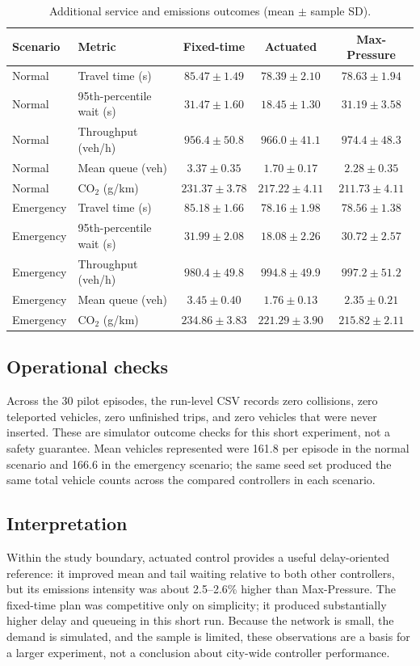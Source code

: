 \documentclass[11pt,a4paper]{article}
\begin{document}
\begin{table}[htbp]
\centering\small
\caption{Additional service and emissions outcomes (mean $\pm$ sample SD).}
\begin{tabular}{llccc}
\toprule
\textbf{Scenario} & \textbf{Metric} & \textbf{Fixed-time} & \textbf{Actuated} & \textbf{Max-Pressure} \\
\midrule
Normal & Travel time (s) & $85.47\pm1.49$ & $78.39\pm2.10$ & $78.63\pm1.94$ \\
Normal & 95th-percentile wait (s) & $31.47\pm1.60$ & $18.45\pm1.30$ & $31.19\pm3.58$ \\
Normal & Throughput (veh/h) & $956.4\pm50.8$ & $966.0\pm41.1$ & $974.4\pm48.3$ \\
Normal & Mean queue (veh) & $3.37\pm0.35$ & $1.70\pm0.17$ & $2.28\pm0.35$ \\
Normal & CO$_2$ (g/km) & $231.37\pm3.78$ & $217.22\pm4.11$ & $\mathbf{211.73\pm4.11}$ \\
\midrule
Emergency & Travel time (s) & $85.18\pm1.66$ & $78.16\pm1.98$ & $78.56\pm1.38$ \\
Emergency & 95th-percentile wait (s) & $31.99\pm2.08$ & $18.08\pm2.26$ & $30.72\pm2.57$ \\
Emergency & Throughput (veh/h) & $980.4\pm49.8$ & $994.8\pm49.9$ & $997.2\pm51.2$ \\
Emergency & Mean queue (veh) & $3.45\pm0.40$ & $1.76\pm0.13$ & $2.35\pm0.21$ \\
Emergency & CO$_2$ (g/km) & $234.86\pm3.83$ & $221.29\pm3.90$ & $\mathbf{215.82\pm2.11}$ \\
\bottomrule
\end{tabular}
\end{table}

\subsection{Operational checks}
Across the 30 pilot episodes, the run-level CSV records zero collisions, zero
teleported vehicles, zero unfinished trips, and zero vehicles that were never inserted.
These are simulator outcome checks for this short experiment, not a safety guarantee.
Mean vehicles represented were 161.8 per episode in the normal scenario and 166.6 in
the emergency scenario; the same seed set produced the same total vehicle counts
across the compared controllers in each scenario.

\subsection{Interpretation}
Within the study boundary, actuated control provides a useful delay-oriented
reference: it improved mean and tail waiting relative to both other controllers, but
its emissions intensity was about 2.5--2.6\% higher than Max-Pressure. The fixed-time
plan was competitive only on simplicity; it produced substantially higher delay and
queueing in this short run. Because the network is small, the demand is simulated, and
the sample is limited, these observations are a basis for a larger experiment, not a
conclusion about city-wide controller performance.
\end{document}
